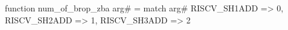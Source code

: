 function num_of_brop_zba arg# = match arg# {
  RISCV_SH1ADD => 0,
  RISCV_SH2ADD => 1,
  RISCV_SH3ADD => 2
}
